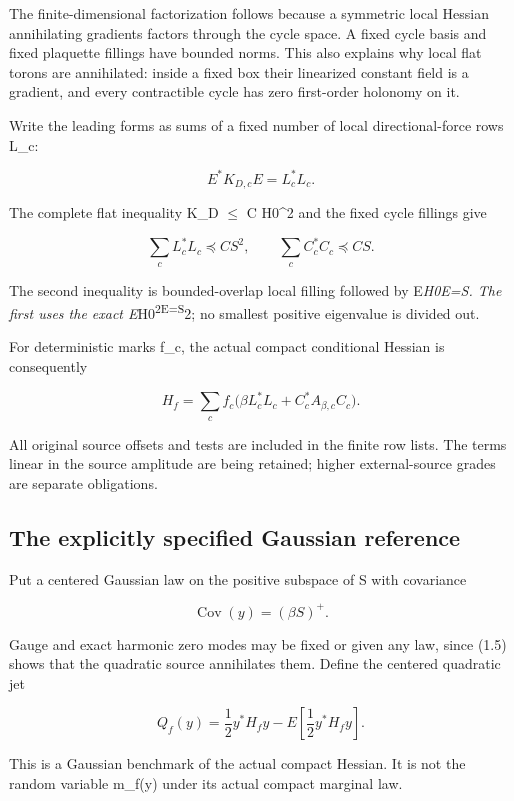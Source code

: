 \documentclass[
  11pt,
]{article}
\begin{document}
The finite-dimensional factorization follows because a symmetric local
Hessian annihilating gradients factors through the cycle space. A fixed
cycle basis and fixed plaquette fillings have bounded norms. This also
explains why local flat torons are annihilated: inside a fixed box their
linearized constant field is a gradient, and every contractible cycle
has zero first-order holonomy on it.

Write the leading forms as sums of a fixed number of local
directional-force rows L\_c:

\[
 E^*K_{D,c}E=L_c^*L_c.
\]

The complete flat inequality K\_D \(\leq\) C H0\^{}2 and the fixed cycle
fillings give

\[
 \sum_cL_c^*L_c\preceq CS^2,
 \qquad
 \sum_cC_c^*C_c\preceq CS.
\tag{1.5}
\]

The second inequality is bounded-overlap local filling followed by
E\emph{H0E=S. The first uses the exact E}H0\textsuperscript{2E=S}2; no
smallest positive eigenvalue is divided out.

For deterministic marks f\_c, the actual compact conditional Hessian is
consequently

\[
 H_f=\sum_cf_c\bigl(\beta L_c^*L_c+C_c^*A_{\beta,c}C_c\bigr).
\tag{1.6}
\]

All original source offsets and tests are included in the finite row
lists. The terms linear in the source amplitude are being retained;
higher external-source grades are separate obligations.

\hypertarget{the-explicitly-specified-gaussian-reference}{%
\subsection{The explicitly specified Gaussian
reference}\label{the-explicitly-specified-gaussian-reference}}

Put a centered Gaussian law on the positive subspace of S with
covariance

\[
 \operatorname{Cov}(y)=(\beta S)^+.
\tag{2.1}
\]

Gauge and exact harmonic zero modes may be fixed or given any law, since
(1.5) shows that the quadratic source annihilates them. Define the
centered quadratic jet

\[
 Q_f(y)=\frac12 y^*H_fy-E\left[\frac12 y^*H_fy\right].
\tag{2.2}
\]

This is a Gaussian benchmark of the actual compact Hessian. It is not
the random variable m\_f(y) under its actual compact marginal law.
\end{document}
